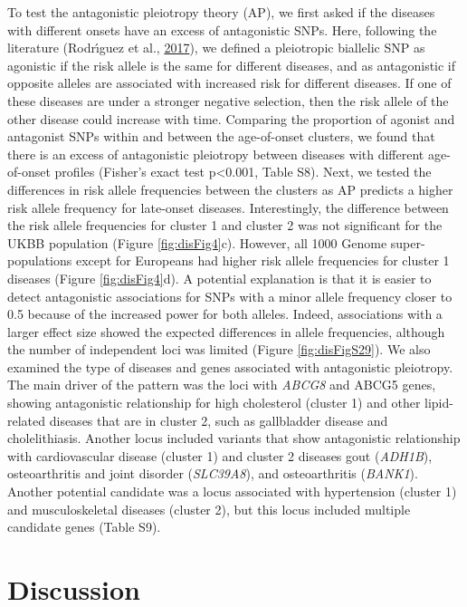 \documentclass[12pt,twoside]{unicam}
\begin{document}
To test the antagonistic pleiotropy theory (AP), we first asked if the diseases with different onsets have an excess of antagonistic SNPs. Here, following the literature (Rodrı́guez et al., \protect\hyperlink{ref-Rodriguez2017}{2017}), we defined a pleiotropic biallelic SNP as agonistic if the risk allele is the same for different diseases, and as antagonistic if opposite alleles are associated with increased risk for different diseases. If one of these diseases are under a stronger negative selection, then the risk allele of the other disease could increase with time. Comparing the proportion of agonist and antagonist SNPs within and between the age-of-onset clusters, we found that there is an excess of antagonistic pleiotropy between diseases with different age-of-onset profiles (Fisher's exact test p\textless0.001, Table S8). Next, we tested the differences in risk allele frequencies between the clusters as AP predicts a higher risk allele frequency for late-onset diseases. Interestingly, the difference between the risk allele frequencies for cluster 1 and cluster 2 was not significant for the UKBB population (Figure \ref{fig:disFig4}c). However, all 1000 Genome super-populations except for Europeans had higher risk allele frequencies for cluster 1 diseases (Figure \ref{fig:disFig4}d). A potential explanation is that it is easier to detect antagonistic associations for SNPs with a minor allele frequency closer to 0.5 because of the increased power for both alleles. Indeed, associations with a larger effect size showed the expected differences in allele frequencies, although the number of independent loci was limited (Figure \ref{fig:disFigS29}). We also examined the type of diseases and genes associated with antagonistic pleiotropy. The main driver of the pattern was the loci with \emph{ABCG8} and ABCG5 genes, showing antagonistic relationship for high cholesterol (cluster 1) and other lipid-related diseases that are in cluster 2, such as gallbladder disease and cholelithiasis. Another locus included variants that show antagonistic relationship with cardiovascular disease (cluster 1) and cluster 2 diseases gout (\emph{ADH1B}), osteoarthritis and joint disorder (\emph{SLC39A8}), and osteoarthritis (\emph{BANK1}). Another potential candidate was a locus associated with hypertension (cluster 1) and musculoskeletal diseases (cluster 2), but this locus included multiple candidate genes (Table S9).

\hypertarget{discussion-1}{%
\section{Discussion}\label{discussion-1}}
\end{document}
